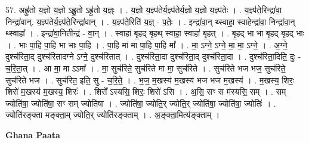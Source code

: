 \documentclass[17pt]{extarticle}
\begin{document}
57. अह्रु॑तो य॒ज्ञो य॒ज्ञो ऽह्रु॒तो ऽह्रु॑तो य॒ज्ञ्ः । . य॒ज्ञो य॒ज्ञ्प॑तेर्य॒ज्ञ्प॑तेर्य॒ज्ञो य॒ज्ञो य॒ज्ञ्प॑तेः । . य॒ज्ञ्प॑ते॒रिन्द्रा॑वा॒ निन्द्रा॑वान्. य॒ज्ञ्प॑तेर्य॒ज्ञ्प॑ते॒रिन्द्रा॑वान् । . य॒ज्ञ्प॑ते॒रिति॑ य॒ज्ञ् - प॒तेः॒ । . इन्द्रा॑वा॒न् थ्स्वाहा॒ स्वाहेन्द्रा॑वा॒ निन्द्रा॑वा॒न् थ्स्वाहा᳚ । . इन्द्रा॑वा॒नितीन्द्र॑ - वा॒न् । . स्वाहा॑ बृ॒हद् बृ॒हथ् स्वाहा॒ स्वाहा॑ बृ॒हत् । . बृ॒हद् भा भा बृ॒हद् बृ॒हद् भाः । . भाः पा॒हि पा॒हि भा भाः पा॒हि । . पा॒हि मा॑ मा पा॒हि पा॒हि मा᳚ । . मा॒ ऽग्ने॒ ऽग्ने॒ मा॒ मा॒ ऽग्ने॒ । . अ॒ग्ने॒ दुश्च॑रिता॒द् दुश्च॑रितादग्ने ऽग्ने॒ दुश्च॑रितात् । . दुश्च॑रिता॒दा दुश्च॑रिता॒द् दुश्च॑रिता॒दा । . दुश्च॑रिता॒दिति॒ दुः - च॒रि॒ता॒त् । . आ मा॒ मा ऽऽमा᳚ । . मा॒ सुच॑रिते॒ सुच॑रिते मा मा॒ सुच॑रिते । . सुच॑रिते भज भज॒ सुच॑रिते॒ सुच॑रिते भज । . सुच॑रित॒ इति॒ सु - च॒रि॒ते॒ । . भ॒ज॒ म॒खस्य॑ म॒खस्य॑ भज भज म॒खस्य॑ । . म॒खस्य॒ शिरः॒ शिरो॑ म॒खस्य॑ म॒खस्य॒ शिरः॑ । . शिरो᳚ ऽस्यसि॒ शिरः॒ शिरो॑ ऽसि । . अ॒सि॒ सꣳ स म॑स्यसि॒ सम् । . सम् ज्योति॑षा॒ ज्योति॑षा॒ सꣳ सम् ज्योति॑षा । . ज्योति॑षा॒ ज्योति॒र् ज्योति॒र् ज्योति॑षा॒ ज्योति॑षा॒ ज्योतिः॑ । . ज्योति॑रङ्क्ता मङ्क्ता॒म् ज्योति॒र् ज्योति॑रङ्क्ताम् । . अ॒ङ्क्ता॒मित्य॑ङ्क्ताम् । \newline

\textbf{Ghana Paata } \newline
\end{document}

